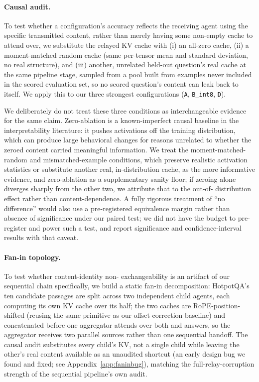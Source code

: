 \documentclass[11pt]{article}
\begin{document}
\paragraph{Causal audit.} To test whether a configuration's accuracy
reflects the receiving agent using the specific transmitted content,
rather than merely having some non-empty cache to attend over, we
substitute the relayed KV cache with (i) an all-zero cache, (ii) a
moment-matched random cache (same per-tensor mean and standard deviation,
no real structure), and (iii) another, unrelated held-out question's real
cache at the same pipeline stage, sampled from a pool built from examples
never included in the scored evaluation set, so no scored question's
content can leak back to itself. We apply this to our three strongest
configurations (\texttt{A}, \texttt{B\_int8}, \texttt{D}).

We deliberately do not treat these three conditions as interchangeable
evidence for the same claim. Zero-ablation is a known-imperfect causal
baseline in the interpretability literature: it pushes activations off
the training distribution, which can produce large behavioral changes for
reasons unrelated to whether the zeroed content carried meaningful
information. We treat the moment-matched-random and mismatched-example
conditions, which preserve realistic activation statistics or substitute
another real, in-distribution cache, as the more informative evidence,
and zero-ablation as a supplementary sanity floor; if zeroing alone
diverges sharply from the other two, we attribute that to the out-of-
distribution effect rather than content-dependence. A fully rigorous
treatment of ``no difference'' would also use a pre-registered
equivalence margin rather than absence of significance under our paired
test; we did not have the budget to pre-register and power such a test,
and report significance and confidence-interval results with that
caveat.

\paragraph{Fan-in topology.} To test whether content-identity non-
exchangeability is an artifact of our sequential chain specifically, we
build a static fan-in decomposition: HotpotQA's ten candidate passages
are split across two independent child agents, each computing its own KV
cache over its half; the two caches are RoPE-position-shifted (reusing
the same primitive as our offset-correction baseline) and concatenated
before one aggregator attends over both and answers, so the aggregator
receives two parallel sources rather than one sequential handoff. The
causal audit substitutes every child's KV, not a single child while
leaving the other's real content available as an unaudited shortcut (an
early design bug we found and fixed; see Appendix~\ref{app:faninbug}),
matching the full-relay-corruption strength of the sequential pipeline's
own audit.
\end{document}
